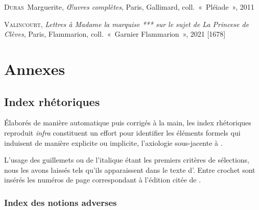 \documentclass[12pt, a4paper]{article}
\begin{document}
	\textsc{Duras}~Marguerite, \textit{Œuvres complètes}, Paris, Gallimard, coll.~«~Pléiade~», 2011\par 
	\textsc{Valincourt}, \textit{Lettres à Madame la marquise *** sur le sujet de La Princese de Clèves}, Paris, Flammarion, coll.~«~Garnier Flammarion~», 2021 [1678]\par 
		
		  
\newpage

\section{Annexes}

\subsection{Index rhétoriques}
\label{gloss}

Élaborés de manière automatique puis corrigés à la main, les index rhétoriques reproduit \textit{infra} constituent un effort pour identifier les éléments formels qui induisent de manière explicite ou implicite, l'axiologie sous-jacente à \punr.

L'usage des guillemets ou de l'italique étant les premiers critères de sélections, nous les avons laissés tels qu'ils apparaissent dans le texte d'\robbe. Entre crochet sont insérés les numéros de page correspondant à l'édition citée de \punr.

\subsubsection{Index des notions adverses}
\end{document}
